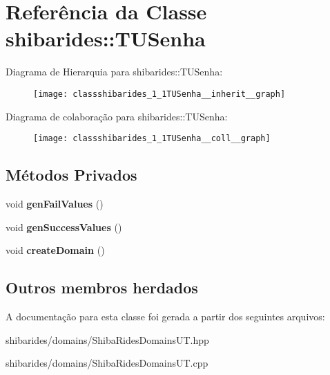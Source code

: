 \hypertarget{classshibarides_1_1TUSenha}{}\section{Referência da Classe shibarides\+:\+:T\+U\+Senha}
\label{classshibarides_1_1TUSenha}


Diagrama de Hierarquia para shibarides\+:\+:T\+U\+Senha\+:\nopagebreak
\begin{figure}[H]
\begin{center}
\leavevmode
\texttt{[image: classshibarides\_1\_1TUSenha\_\_inherit\_\_graph]}
\end{center}
\end{figure}


Diagrama de colaboração para shibarides\+:\+:T\+U\+Senha\+:\nopagebreak
\begin{figure}[H]
\begin{center}
\leavevmode
\texttt{[image: classshibarides\_1\_1TUSenha\_\_coll\_\_graph]}
\end{center}
\end{figure}
\subsection*{Métodos Privados}
\begin{DoxyCompactItemize}
\item 
void {\bfseries gen\+Fail\+Values} ()\hypertarget{classshibarides_1_1TUSenha_a36e77e3c35ed308d5b02ec1776ca1fc5}{}\label{classshibarides_1_1TUSenha_a36e77e3c35ed308d5b02ec1776ca1fc5}

\item 
void {\bfseries gen\+Success\+Values} ()\hypertarget{classshibarides_1_1TUSenha_a4a84474c545c06eaf95c6e90fd89e24a}{}\label{classshibarides_1_1TUSenha_a4a84474c545c06eaf95c6e90fd89e24a}

\item 
void {\bfseries create\+Domain} ()\hypertarget{classshibarides_1_1TUSenha_a31dfa215fd8c677220f9e3c79c9694fd}{}\label{classshibarides_1_1TUSenha_a31dfa215fd8c677220f9e3c79c9694fd}

\end{DoxyCompactItemize}
\subsection*{Outros membros herdados}


A documentação para esta classe foi gerada a partir dos seguintes arquivos\+:\begin{DoxyCompactItemize}
\item 
shibarides/domains/Shiba\+Rides\+Domains\+U\+T.\+hpp\item 
shibarides/domains/Shiba\+Rides\+Domains\+U\+T.\+cpp\end{DoxyCompactItemize}
